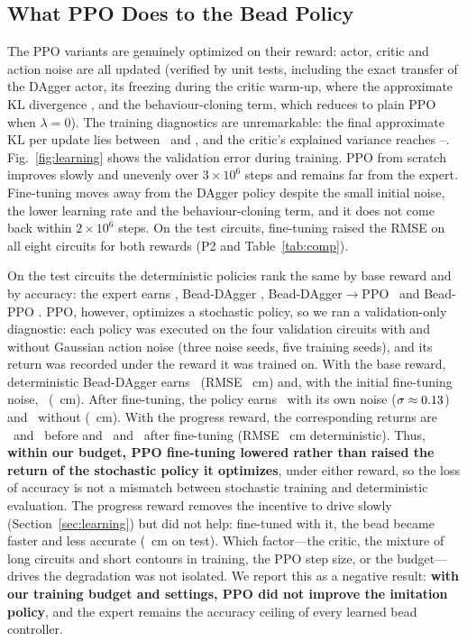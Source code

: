 \documentclass[conference]{IEEEtran}
\begin{document}
\subsection{What PPO Does to the Bead Policy}\label{sec:ppo}
The PPO variants are genuinely optimized on their reward: actor, critic and action noise are all updated (verified by unit tests, including the exact transfer of the DAgger actor, its freezing during the critic warm-up, where the approximate KL divergence \VfrozenKL, and the behaviour-cloning term, which reduces to plain PPO when $\lambda=0$). The training diagnostics are unremarkable: the final approximate KL per update lies between \VklLo~and \VklHi, and the critic's explained variance reaches \VevLo--\VevHi. Fig.~\ref{fig:learning} shows the validation error during training. PPO from scratch improves slowly and unevenly over $3\times10^6$ steps and remains far from the expert. Fine-tuning moves away from the DAgger policy despite the small initial noise, the lower learning rate and the behaviour-cloning term, and it does not come back within $2\times10^6$ steps. On the test circuits, fine-tuning raised the RMSE on all eight circuits for both rewards (P2 and Table~\ref{tab:comp}).

On the test circuits the deterministic policies rank the same by base reward and by accuracy: the expert earns \VrewExpert, Bead-DAgger \VrewDagger, Bead-DAgger$\to$PPO \VrewDP\ and Bead-PPO \VrewPPO. PPO, however, optimizes a stochastic policy, so we ran a validation-only diagnostic: each policy was executed on the four validation circuits with and without Gaussian action noise (three noise seeds, five training seeds), and its return was recorded under the reward it was trained on. With the base reward, deterministic Bead-DAgger earns \VdiagDPDagDetrew\ (RMSE \VdiagDPDagDetrmse~cm) and, with the initial fine-tuning noise, \VdiagDPDagStorew\ (\VdiagDPDagStormse~cm). After fine-tuning, the policy earns \VdiagDPFtStorew\ with its own noise ($\sigma\approx0.13$) and \VdiagDPFtDetrew\ without (\VdiagDPFtDetrmse~cm). With the progress reward, the corresponding returns are \VdiagDPaccDagDetrew\ and \VdiagDPaccDagStorew\ before and \VdiagDPaccFtStorew\ and \VdiagDPaccFtDetrew\ after fine-tuning (RMSE \VdiagDPaccFtDetrmse~cm deterministic). Thus, \textbf{within our budget, PPO fine-tuning lowered rather than raised the return of the stochastic policy it optimizes}, under either reward, so the loss of accuracy is not a mismatch between stochastic training and deterministic evaluation. The progress reward removes the incentive to drive slowly (Section~\ref{sec:learning}) but did not help: fine-tuned with it, the bead became faster and less accurate (\VrmseDPacc~cm on test). Which factor---the critic, the mixture of long circuits and short contours in training, the PPO step size, or the budget---drives the degradation was not isolated. We report this as a negative result: \textbf{with our training budget and settings, PPO did not improve the imitation policy}, and the expert remains the accuracy ceiling of every learned bead controller.
\end{document}
